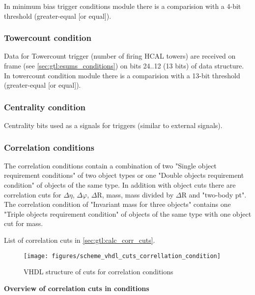 In minimum bias trigger conditions module there is a comparision with a 4-bit threshold (greater-equal [or equal]).

\subsubsection{Towercount condition}
\label{sec:gtl:towercount_cond}

Data for Towercount trigger (number of firing HCAL towers) are received on frame \htt (see \ref{sec:gtl:esums_conditions}) on bits 24..12 (13 bits) of \htt data structure.\\
In towercount condition module there is a comparision with a 13-bit threshold (greater-equal [or equal]).

\subsubsection{Centrality condition}
\label{sec:gtl:centrality_cond}

Centrality bits used as a signals for triggers (similar to external signals).

\clearpage

\subsubsection{Correlation conditions}
\label{sec:gtl:correlation_conditions}

The correlation conditions contain a combination of two "Single object requirement conditions" of two object types or one "Double objects requirement condition" of objects of the same type. In addition with object cuts there are correlation cuts for $\Delta\eta$, $\Delta\varphi$, $\Delta$R, mass, mass divided by $\Delta$R and "two-body pt".\\
The correlation condition of "Invariant mass for three objects" contains one "Triple objects requirement condition" of objects of the same type with one object cut for mass.

List of correlation cuts in \ref{sec:gtl:calc_corr_cuts}.

\begin{figure}[htb]
\centering
\texttt{[image: figures/scheme\_vhdl\_cuts\_correllation\_condition]}
\caption{VHDL structure of cuts for correlation conditions}
\label{fig:gtl:scheme_vhdl_cuts_correllation_condition}
\end{figure}

\textbf{Overview of correlation cuts in conditions}
\label{sec:gtl:overview_correlation_cuts}

